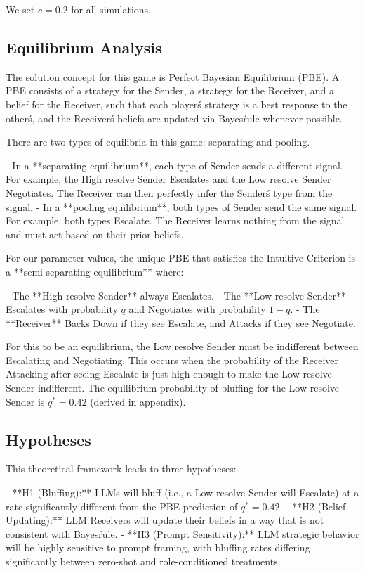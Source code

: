 \documentclass[12pt]{article}
\theoremstyle{plain}
\theoremstyle{definition}
\begin{document}
We set $c=0.2$ for all simulations.

\subsection{Equilibrium Analysis}

The solution concept for this game is Perfect Bayesian Equilibrium (PBE). A PBE consists of a strategy for the Sender, a strategy for the Receiver, and a belief for the Receiver, such that each player\'s strategy is a best response to the other\'s, and the Receiver\'s beliefs are updated via Bayes\' rule whenever possible.

There are two types of equilibria in this game: separating and pooling.

- In a **separating equilibrium**, each type of Sender sends a different signal. For example, the High resolve Sender Escalates and the Low resolve Sender Negotiates. The Receiver can then perfectly infer the Sender\'s type from the signal.
- In a **pooling equilibrium**, both types of Sender send the same signal. For example, both types Escalate. The Receiver learns nothing from the signal and must act based on their prior beliefs.

For our parameter values, the unique PBE that satisfies the Intuitive Criterion is a **semi-separating equilibrium** where:

- The **High resolve Sender** always Escalates.
- The **Low resolve Sender** Escalates with probability $q$ and Negotiates with probability $1-q$.
- The **Receiver** Backs Down if they see Escalate, and Attacks if they see Negotiate.

For this to be an equilibrium, the Low resolve Sender must be indifferent between Escalating and Negotiating. This occurs when the probability of the Receiver Attacking after seeing Escalate is just high enough to make the Low resolve Sender indifferent. The equilibrium probability of bluffing for the Low resolve Sender is $q^* = 0.42$ (derived in appendix).

\subsection{Hypotheses}

This theoretical framework leads to three hypotheses:

- **H1 (Bluffing):** LLMs will bluff (i.e., a Low resolve Sender will Escalate) at a rate significantly different from the PBE prediction of $q^*=0.42$.
- **H2 (Belief Updating):** LLM Receivers will update their beliefs in a way that is not consistent with Bayes\' rule.
- **H3 (Prompt Sensitivity):** LLM strategic behavior will be highly sensitive to prompt framing, with bluffing rates differing significantly between zero-shot and role-conditioned treatments.
\end{document}
